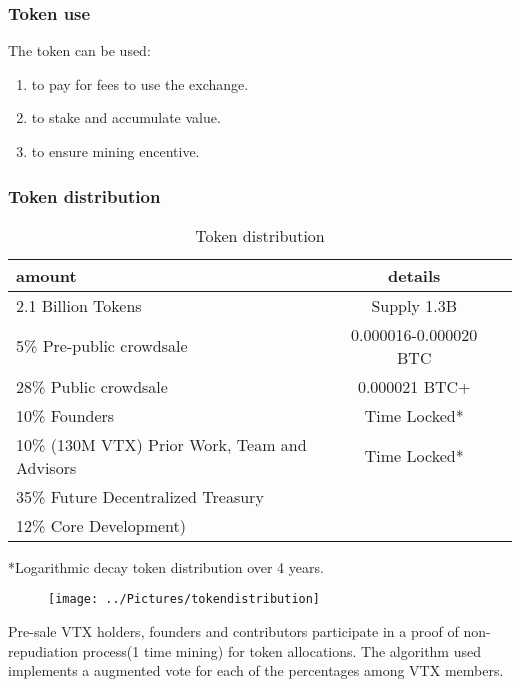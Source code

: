 \documentclass[]{article}
\begin{document}
\subsubsection{Token use}

The token can be used:
\begin{enumerate}
\item to pay for fees to use the exchange.
\item to stake and accumulate value.
\item to ensure mining encentive.
\end{enumerate}
 
\subsubsection{Token distribution}	
\begin{table}[h!]
	\begin{center}
		\caption{Token distribution}
		\label{tab:table1}
		\begin{tabular}{l|c|r}
			\textbf{amount} & \textbf{details} \\
			\hline
			2.1 Billion Tokens & Supply 1.3B \\
			\hline
			\hline
			5\%  Pre-public crowdsale & 0.000016-0.000020 BTC \\
			\hline
			28\% Public crowdsale & 0.000021 BTC+ \\
			\hline
			10\% Founders & Time Locked*\\
			\hline
			10\% (130M VTX) Prior Work, Team and Advisors & Time Locked*\\
			\hline
			35\% Future Decentralized Treasury\\
			\hline
			12\% Core Development)\\
			\hline				
		\end{tabular}
	\end{center}

*Logarithmic decay token distribution over 4 years.\\
\end{table}

\begin{figure}
	\centering
	\texttt{[image: ../Pictures/tokendistribution]}
	\caption{}
	\label{fig:tokendistribution}
\end{figure}




Pre-sale VTX holders, founders and contributors participate in a proof of non-repudiation process(1 time mining) for token allocations.
The algorithm used implements a augmented vote for each of the 
percentages among VTX members.
\end{document}
